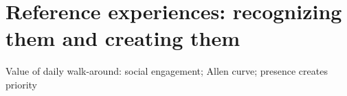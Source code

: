 \section{Reference experiences: recognizing them and creating them}

Value of daily walk-around: 
social engagement; 
Allen curve; 
presence creates priority